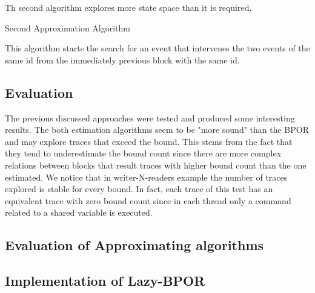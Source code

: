 Th second algorithm explores more state space than it is required.\\

\begin{algorithm}[H]
    \caption{Second Approximation Algorithm}
\end{algorithm}

This algorithm starts the search for an event that intervenes the two events of the same id from the immediately previous block 
with the same id. 

\subsection{Evaluation}
The previous discussed approaches were tested and produced some interesting results. The both estimation algorithms seem to be "more sound" than the BPOR and
may explore traces that exceed the bound. This stems from the fact that they tend to underestimate the bound count since there are more complex relations 
between blocks that result traces with higher bound count than the one estimated. We notice that in writer-N-readers example the number of traces explored
is stable for every bound. In fact, each trace of this test has an equivalent trace with zero bound count since in each thread only a command related to
a shared variable is executed.

\subsection{Evaluation of Approximating algorithms}


\subsection{Implementation of Lazy-BPOR}

